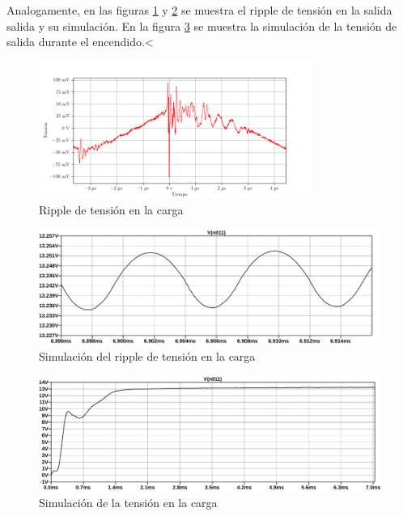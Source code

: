 Analogamente, en las figuras \ref{fig:osc:58} y \ref{fig:sim:21ripple} se muestra el ripple de tensión en la salida salida y su simulación. En la figura \ref{fig:sim:21} se muestra la simulación de la tensión de salida durante el encendido.<

\begin{figure}[H]
    \centering
    \includegraphics[width=0.8\textwidth]{images/capturas-osciloscopio/17-11-2022/58.png}
    \caption{Ripple de tensión en la carga}
    \label{fig:osc:58}
\end{figure}

\begin{figure}[H]
    \centering
    \includegraphics[width=\textwidth]{images/sim/21-ripple.pdf}
    \caption{Simulación del ripple de tensión en la carga}
    \label{fig:sim:21ripple}
\end{figure}

\begin{figure}[H]
    \centering
    \includegraphics[width=\textwidth]{images/sim/21.pdf}
    \caption{Simulación de la tensión en la carga}
    \label{fig:sim:21}
\end{figure}
